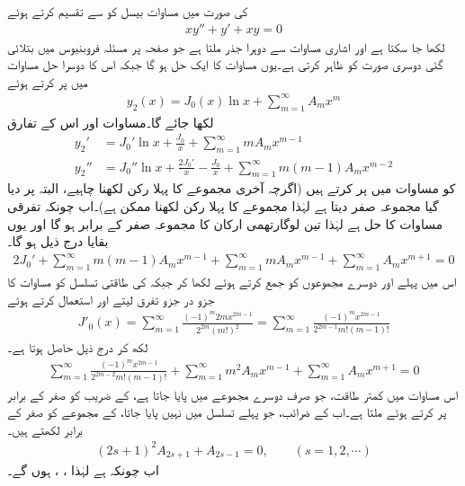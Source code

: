  کی صورت میں مساوات بیسل کو  سے تقسیم کرتے ہوئے
\begin{align}\label{مساوات_بیسل_دوہرا_صفر_الف}
xy''+y'+xy=0
\end{align}
لکھا جا سکتا ہے اور اشاری مساوات  سے دوہرا جذر  ملتا ہے  جو صفحہ  پر مسئلہ فروبنیوس میں بتلائی گئی دوسری صورت کو ظاہر کرتی ہے۔یوں مساوات  کا ایک حل  ہو گا جبکہ اس کا دوسرا حل مساوات  میں  پر کرتے ہوئے  
\begin{align}\label{مساوات_بیسل_دوہرا_صفر_ب}
y_2(x)=J_0(x)\ln x+\sum_{m=1}^{\infty}A_m x^m 
\end{align}
لکھا جائے گا۔مساوات  اور اس کے تفارق
\begin{align*}
y_2'&=J_0' \ln x+\frac{J_0}{x}+\sum_{m=1}^{\infty}mA_mx^{m-1}\\
y_2''&=J_0''\ln x+\frac{2J_0'}{x}-\frac{J_0}{x}+\sum_{m=1}^{\infty} m(m-1)A_m x^{m-2}
\end{align*}
کو مساوات  میں پر کرتے ہیں (اگرچہ آخری مجموعے کا پہلا رکن  لکھنا چاہیے، البتہ  پر دیا گیا مجموعہ صفر دیتا ہے لہٰذا مجموعے کا پہلا رکن  لکھنا ممکن ہے)۔اب چونکہ  تفرقی مساوات کا حل ہے لہٰذا  تین لوگارتھمی ارکان کا مجموعہ  صفر کے برابر ہو گا اور یوں بقایا درج ذیل ہو گا۔
\begin{align*}
2J_0'+\sum_{m=1}^{\infty}m(m-1)A_mx^{m-1}+\sum_{m=1}^{\infty}mA_mx^{m-1}+\sum_{m=1}^{\infty}A_mx^{m+1}=0
\end{align*}
اس میں پہلے اور دوسرے  مجموعوں کو جمع کرتے ہوئے  لکھا کر جبکہ  کی طاقتی تسلسل کو مساوات  کا جزو در جزو تفرق لیتے اور  استعمال کرتے ہوئے
\begin{align*}
J'_0(x)=\sum_{m=1}^{\infty}\frac{(-1)^m2mx^{2m-1}}{2^{2m}(m!)^2}=\sum_{m=1}^{\infty}\frac{(-1)^mx^{2m-1}}{2^{2m-1}m!(m-1)!}
\end{align*} 
لکھ کر درج ذیل حاصل ہوتا ہے۔
\begin{align}\label{مساوات_بیسل_دوہرا_صفر_پ}
\sum_{m=1}^{\infty}\frac{(-1)^mx^{2m-1}}{2^{2m-2}m!(m-1)!}+\sum_{m=1}^{\infty} m^2A_mx^{m-1}+\sum_{m=1}^{\infty}A_mx^{m+1}=0
\end{align}
اس مساوات میں  کمتر طاقت، جو صرف دوسرے مجموعے میں پایا جاتا ہے، کے  ضریب  کو صفر کے برابر پر کرتے ہوئے  ملتا ہے۔اب  کے ضرائب، جو پہلے تسلسل میں نہیں پایا جاتا، کے مجموعے کو صفر کے برابر لکھتے ہیں۔
\begin{align*}
(2s+1)^2A_{2s+1}+A_{2s-1}=0,\quad \quad (s=1,2,\cdots)
\end{align*}
اب چونکہ  ہے لہٰذا ، ،  ہوں گے۔ 

